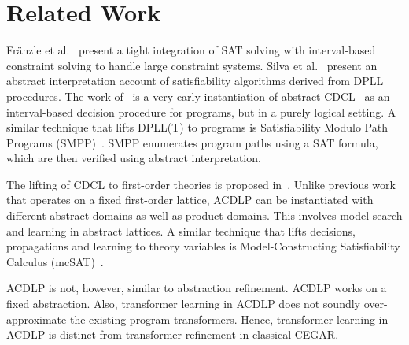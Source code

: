 \section{Related Work}

Fr{\"a}nzle et al.~\cite{franzle} present a tight integration of SAT solving
with interval-based constraint solving to handle large constraint systems.
%
Silva et al.~\cite{sas12} present an abstract interpretation account of 
satisfiability algorithms derived from DPLL procedures.  
%
The work of~\cite{tacas12} is a very early instantiation of abstract 
CDCL~\cite{sas12} as an interval-based decision procedure for programs, 
but in a purely logical setting.  
%
A similar technique that lifts DPLL(T) to programs is Satisfiability Modulo 
Path Programs (SMPP)~\cite{SMPP}. SMPP enumerates program paths using a SAT 
formula, which are then verified using abstract interpretation.  
%

The lifting of CDCL to first-order theories is proposed
in~\cite{dpll,ndsmt,vmcai13}.  Unlike previous work that operates on a fixed
first-order lattice, ACDLP can be instantiated with different abstract
domains as well as product domains.  This involves model search and learning
in abstract lattices.  A similar technique that lifts decisions,
propagations and learning to theory variables is Model-Constructing
Satisfiability Calculus (mcSAT)~\cite{vmcai13}.

%
  
  ACDLP is not, however, similar to abstraction refinement. ACDLP works on a fixed
  abstraction. Also, transformer learning in ACDLP does not soundly over-approximate
  the existing program transformers. 
  Hence, transformer learning in ACDLP is distinct from transformer refinement in classical CEGAR. 

%
%
%
%

